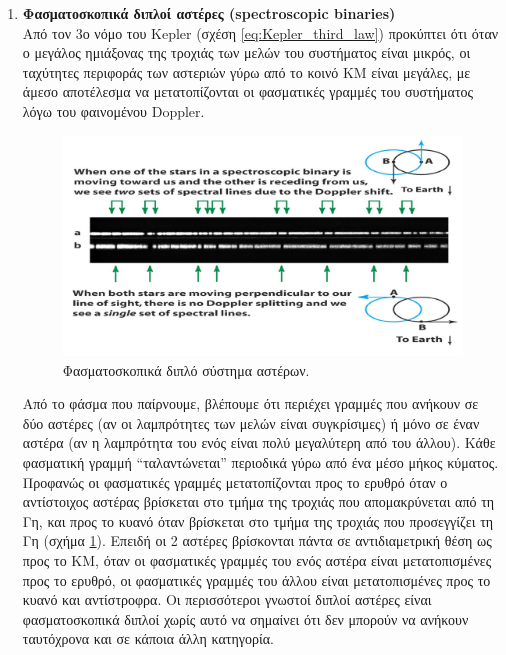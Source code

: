 \begin{enumerate}[label=(\Roman*)]
    \item \textbf{Φασματοσκοπικά διπλοί αστέρες (spectroscopic binaries)} \\
    Από τον 3ο νόμο του Kepler (σχέση \eqref{eq:Kepler_third_law}) προκύπτει ότι όταν ο μεγάλος ημιάξονας της τροχιάς των μελών του συστήματος είναι μικρός, οι ταχύτητες περιφοράς των αστεριών γύρω από το κοινό ΚΜ είναι μεγάλες, με άμεσο αποτέλεσμα να μετατοπίζονται οι φασματικές γραμμές του συστήματος λόγω του φαινομένου Doppler.
        \begin{figure}
            \centering
            \includegraphics[scale=0.4]{Figures/spectroscopic_binary.png}
            \caption{Φασματοσκοπικά διπλό σύστημα αστέρων.}
            \label{fig:spectroscopic_binary}
        \end{figure}
    Από το φάσμα που παίρνουμε, βλέπουμε ότι περιέχει γραμμές που ανήκουν σε δύο αστέρες (αν οι λαμπρότητες των μελών είναι συγκρίσιμες) ή μόνο σε έναν αστέρα (αν η λαμπρότητα του ενός είναι πολύ μεγαλύτερη από του άλλου). Κάθε φασματική γραμμή ``ταλαντώνεται'' περιοδικά γύρω από ένα μέσο μήκος κύματος. Προφανώς οι φασματικές γραμμές μετατοπίζονται προς το ερυθρό όταν ο αντίστοιχος αστέρας βρίσκεται στο τμήμα της τροχιάς που απομακρύνεται από τη Γη, και προς το κυανό όταν βρίσκεται στο τμήμα της τροχιάς που προσεγγίζει τη Γη (σχήμα \ref{fig:spectroscopic_binary}). Επειδή οι 2 αστέρες βρίσκονται πάντα σε αντιδιαμετρική θέση ως προς το ΚΜ, όταν οι φασματικές γραμμές του ενός αστέρα είναι μετατοπισμένες προς το ερυθρό, οι φασματικές γραμμές του άλλου είναι μετατοπισμένες προς το κυανό και αντίστροφρα. Οι περισσότεροι γνωστοί διπλοί αστέρες είναι φασματοσκοπικά διπλοί χωρίς αυτό να σημαίνει ότι δεν μπορούν να ανήκουν ταυτόχρονα και σε κάποια άλλη κατηγορία.
        

\end{enumerate}
